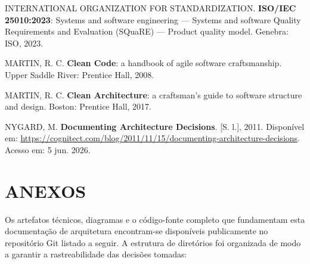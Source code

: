 \documentclass[12pt,a4paper]{article}
\begin{document}
\noindent INTERNATIONAL ORGANIZATION FOR STANDARDIZATION. \textbf{ISO/IEC 25010:2023}: Systems and software engineering — Systems and software Quality Requirements and Evaluation (SQuaRE) — Product quality model. Genebra: ISO, 2023.

\vspace{0.5cm}

\noindent MARTIN, R. C. \textbf{Clean Code}: a handbook of agile software craftsmanship. Upper Saddle River: Prentice Hall, 2008.

\vspace{0.5cm}

\noindent MARTIN, R. C. \textbf{Clean Architecture}: a craftsman's guide to software structure and design. Boston: Prentice Hall, 2017.

\vspace{0.5cm}

\noindent NYGARD, M. \textbf{Documenting Architecture Decisions}. [S. l.], 2011. Disponível em: \url{https://cognitect.com/blog/2011/11/15/documenting-architecture-decisions}. Acesso em: 5 jun. 2026.

\newpage
\section*{ANEXOS}

\noindent Os artefatos técnicos, diagramas e o código-fonte completo que fundamentam esta documentação de arquitetura encontram-se disponíveis publicamente no repositório Git listado a seguir. A estrutura de diretórios foi organizada de modo a garantir a rastreabilidade das decisões tomadas:
\end{document}
